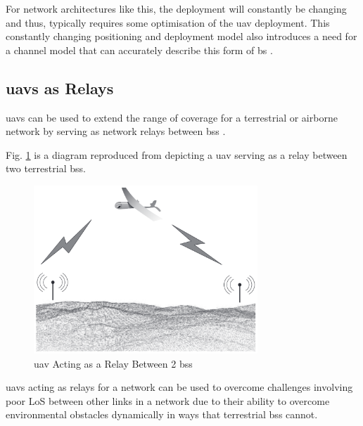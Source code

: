 For network architectures like this, the deployment will constantly be changing and thus, typically requires some optimisation of the \acrshort{uav} deployment. 
This constantly changing positioning and deployment model also introduces a need for a channel model that can accurately describe this form of \acrshort{bs} \cite{saad_wireless_2020}. 

\subsection{\texorpdfstring{\acrshort{uav}s}{UAVs} as Relays}
\acrshort{uav}s can be used to extend the range of coverage for a terrestrial or airborne network by serving as network relays between \acrshort{bs}s \cite{zhang_energy-efficient_2024, namuduri_uav_2017, saad_wireless_2020}. 

Fig. \ref{fig:uav_as_relay_namuduri} is a diagram reproduced from \cite{namuduri_mobile_nodate} depicting a \acrshort{uav} serving as a relay between two terrestrial \acrshort{bs}s. 
\begin{figure}[ht]
    \centering
    \includegraphics[width=0.75\textwidth]{figures/uav_as_relay_saad_textbook.png}
    \caption{\acrshort{uav} Acting as a Relay Between 2 \acrshort{bs}s}
    \label{fig:uav_as_relay_namuduri}
\end{figure}
\acrshort{uav}s acting as relays for a network can be used to overcome challenges involving poor LoS between other links in a network due to their ability to overcome environmental obstacles dynamically in ways that terrestrial \acrshort{bs}s cannot. 

